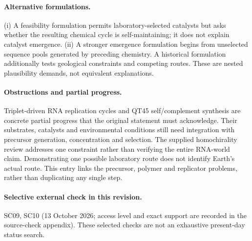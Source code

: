 \documentclass[11pt]{article}
\begin{document}
\paragraph{Alternative formulations.} (i) A feasibility formulation permits laboratory-selected catalysts but asks whether the resulting chemical cycle is self-maintaining; it does not explain catalyst emergence. (ii) A stronger emergence formulation begins from unselected sequence pools generated by preceding chemistry. A historical formulation additionally tests geological constraints and competing routes. These are nested plausibility demands, not equivalent explanations.

\paragraph{Obstructions and partial progress.} Triplet-driven RNA replication cycles and QT45 self/complement synthesis are concrete partial progress that the original statement must acknowledge. Their substrates, catalysts and environmental conditions still need integration with precursor generation, concentration and selection. The supplied homochirality review addresses one constraint rather than verifying the entire RNA-world claim. Demonstrating one possible laboratory route does not identify Earth's actual route. This entry links the precursor, polymer and replicator problems, rather than duplicating any single step.

\paragraph{Selective external check in this revision.} SC09, SC10 (13 October 2026; access level and exact support are recorded in the source-check appendix). These selected checks are not an exhaustive present-day status search.
\end{document}
